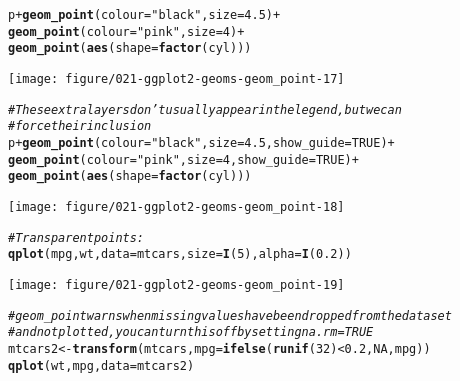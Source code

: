 \documentclass[a4paper,titlepage]{tufte-handout}\usepackage[]{graphicx}\usepackage[]{color}
\makeatletter
\def\maxwidth{ %
  \ifdim\Gin@nat@width>\linewidth
    \linewidth
  \else
    \Gin@nat@width
  \fi
}
\newcommand{\hlnum}[1]{\textcolor[rgb]{0.686,0.059,0.569}{#1}}%
\newcommand{\hlstr}[1]{\textcolor[rgb]{0.192,0.494,0.8}{#1}}%
\newcommand{\hlcom}[1]{\textcolor[rgb]{0.678,0.584,0.686}{\textit{#1}}}%
\newcommand{\hlopt}[1]{\textcolor[rgb]{0,0,0}{#1}}%
\newcommand{\hlstd}[1]{\textcolor[rgb]{0.345,0.345,0.345}{#1}}%
\newcommand{\hlkwb}[1]{\textcolor[rgb]{0.69,0.353,0.396}{#1}}%
\newcommand{\hlkwc}[1]{\textcolor[rgb]{0.333,0.667,0.333}{#1}}%
\newcommand{\hlkwd}[1]{\textcolor[rgb]{0.737,0.353,0.396}{\textbf{#1}}}%
\newenvironment{kframe}{%
 \def\at@end@of@kframe{}%
 \ifinner\ifhmode%
  \def\at@end@of@kframe{\end{minipage}}%
  \begin{minipage}{\columnwidth}%
 \fi\fi%
 \def\FrameCommand##1{\hskip\@totalleftmargin \hskip-\fboxsep
 \colorbox{shadecolor}{##1}\hskip-\fboxsep
     \hskip-\linewidth \hskip-\@totalleftmargin \hskip\columnwidth}%
 \MakeFramed {\advance\hsize-\width
   \@totalleftmargin\z@ \linewidth\hsize
   \@setminipage}}%
 {\par\unskip\endMakeFramed%
 \at@end@of@kframe}
\newenvironment{knitrout}{}{} %
\makeatother
\begin{document}
\begin{knitrout}
\begin{kframe}
\begin{alltt}
\hlstd{p} \hlopt{+} \hlkwd{geom_point}\hlstd{(}\hlkwc{colour}\hlstd{=}\hlstr{"black"}\hlstd{,} \hlkwc{size} \hlstd{=} \hlnum{4.5}\hlstd{)} \hlopt{+}
  \hlkwd{geom_point}\hlstd{(}\hlkwc{colour}\hlstd{=}\hlstr{"pink"}\hlstd{,} \hlkwc{size} \hlstd{=} \hlnum{4}\hlstd{)} \hlopt{+}
  \hlkwd{geom_point}\hlstd{(}\hlkwd{aes}\hlstd{(}\hlkwc{shape} \hlstd{=} \hlkwd{factor}\hlstd{(cyl)))}
\end{alltt}
\end{kframe}
\texttt{[image: figure/021-ggplot2-geoms-geom\_point-17]} 
\begin{kframe}\begin{alltt}
\hlcom{# These extra layers don't usually appear in the legend, but we can}
\hlcom{# force their inclusion}
\hlstd{p} \hlopt{+} \hlkwd{geom_point}\hlstd{(}\hlkwc{colour}\hlstd{=}\hlstr{"black"}\hlstd{,} \hlkwc{size} \hlstd{=} \hlnum{4.5}\hlstd{,} \hlkwc{show_guide} \hlstd{=} \hlnum{TRUE}\hlstd{)} \hlopt{+}
  \hlkwd{geom_point}\hlstd{(}\hlkwc{colour}\hlstd{=}\hlstr{"pink"}\hlstd{,} \hlkwc{size} \hlstd{=} \hlnum{4}\hlstd{,} \hlkwc{show_guide} \hlstd{=} \hlnum{TRUE}\hlstd{)} \hlopt{+}
  \hlkwd{geom_point}\hlstd{(}\hlkwd{aes}\hlstd{(}\hlkwc{shape} \hlstd{=} \hlkwd{factor}\hlstd{(cyl)))}
\end{alltt}
\end{kframe}
\texttt{[image: figure/021-ggplot2-geoms-geom\_point-18]} 
\begin{kframe}\begin{alltt}
\hlcom{# Transparent points:}
\hlkwd{qplot}\hlstd{(mpg, wt,} \hlkwc{data} \hlstd{= mtcars,} \hlkwc{size} \hlstd{=} \hlkwd{I}\hlstd{(}\hlnum{5}\hlstd{),} \hlkwc{alpha} \hlstd{=} \hlkwd{I}\hlstd{(}\hlnum{0.2}\hlstd{))}
\end{alltt}
\end{kframe}
\texttt{[image: figure/021-ggplot2-geoms-geom\_point-19]} 
\begin{kframe}\begin{alltt}
\hlcom{# geom_point warns when missing values have been dropped from the data set}
\hlcom{# and not plotted, you can turn this off by setting na.rm = TRUE}
\hlstd{mtcars2} \hlkwb{<-} \hlkwd{transform}\hlstd{(mtcars,} \hlkwc{mpg} \hlstd{=} \hlkwd{ifelse}\hlstd{(}\hlkwd{runif}\hlstd{(}\hlnum{32}\hlstd{)} \hlopt{<} \hlnum{0.2}\hlstd{,} \hlnum{NA}\hlstd{, mpg))}
\hlkwd{qplot}\hlstd{(wt, mpg,} \hlkwc{data} \hlstd{= mtcars2)}
\end{alltt}



\end{kframe}
\end{knitrout}
\end{document}
